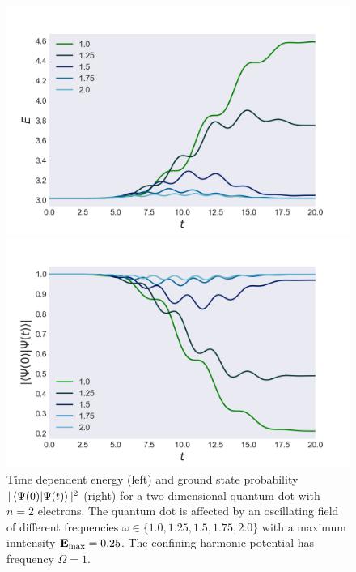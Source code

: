 \begin{figure}
    \centering
    \begin{minipage}{0.49\textwidth}
        \includegraphics[trim=2em 0em 5em 0em, width=\textwidth]{results/figures/2D/resonance/n2resonance.png} 
    \end{minipage}\hfill
    \begin{minipage}{0.49\textwidth}
        \includegraphics[trim=0em 0em 5em 0em, width=\textwidth]{results/figures/2D/resonance/n2overlap_res.png} 
    \end{minipage}
    \caption{Time dependent energy (left) and ground state probability $|\braket{\Psi(0)}{\Psi(t)}|^2$
        (right) for a two-dimensional quantum dot with $n=2$ electrons. The quantum dot 
        is affected by an oscillating field of different frequencies
        $\omega\in\{1.0, 1.25, 1.5, 1.75, 2.0\}$ with a maximum inntensity
        $\vb{E}_\text{max} = 0.25$. The confining harmonic potential has frequency $\Omega=1$.
    }
    \label{fig:2d_resonance_n2}
\end{figure}

